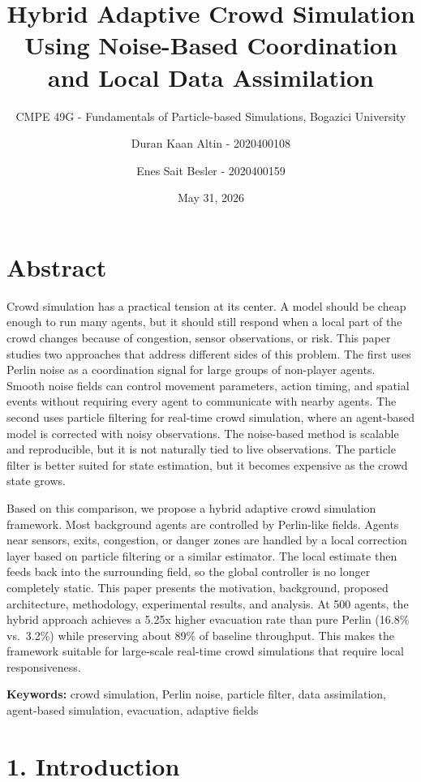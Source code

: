 \documentclass[
  11pt,
]{article}
\title{Hybrid Adaptive Crowd Simulation Using Noise-Based Coordination
and Local Data Assimilation}
\subtitle{CMPE 49G - Fundamentals of Particle-based Simulations,
Bogazici University}
\author{Duran Kaan Altin - 2020400108 \and Enes Sait Besler -
2020400159}
\date{May 31, 2026}
\begin{document}
\maketitle

\section{Abstract}\label{abstract}

Crowd simulation has a practical tension at its center. A model should
be cheap enough to run many agents, but it should still respond when a
local part of the crowd changes because of congestion, sensor
observations, or risk. This paper studies two approaches that address
different sides of this problem. The first uses Perlin noise as a
coordination signal for large groups of non-player agents. Smooth noise
fields can control movement parameters, action timing, and spatial
events without requiring every agent to communicate with nearby agents.
The second uses particle filtering for real-time crowd simulation, where
an agent-based model is corrected with noisy observations. The
noise-based method is scalable and reproducible, but it is not naturally
tied to live observations. The particle filter is better suited for
state estimation, but it becomes expensive as the crowd state grows.

Based on this comparison, we propose a hybrid adaptive crowd simulation
framework. Most background agents are controlled by Perlin-like fields.
Agents near sensors, exits, congestion, or danger zones are handled by a
local correction layer based on particle filtering or a similar
estimator. The local estimate then feeds back into the surrounding
field, so the global controller is no longer completely static. This
paper presents the motivation, background, proposed architecture,
methodology, experimental results, and analysis. At 500 agents, the
hybrid approach achieves a 5.25x higher evacuation rate than pure Perlin
(16.8\% vs.~3.2\%) while preserving about 89\% of baseline throughput.
This makes the framework suitable for large-scale real-time crowd
simulations that require local responsiveness.

\textbf{Keywords:} crowd simulation, Perlin noise, particle filter, data
assimilation, agent-based simulation, evacuation, adaptive fields

\section{1. Introduction}\label{introduction}
\end{document}
